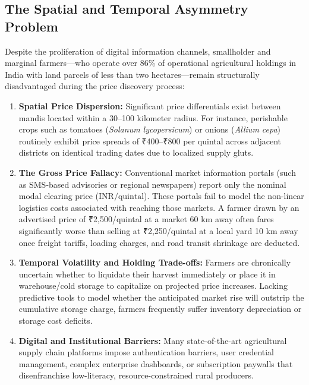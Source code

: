 \documentclass[conference]{IEEEtran}
\begin{document}
\subsection{The Spatial and Temporal Asymmetry Problem}
Despite the proliferation of digital information channels, smallholder and marginal farmers---who operate over 86\% of operational agricultural holdings in India with land parcels of less than two hectares---remain structurally disadvantaged during the price discovery process:
\begin{enumerate}
    \item \textbf{Spatial Price Dispersion:} Significant price differentials exist between mandis located within a 30--100 kilometer radius. For instance, perishable crops such as tomatoes (\textit{Solanum lycopersicum}) or onions (\textit{Allium cepa}) routinely exhibit price spreads of ₹400--₹800 per quintal across adjacent districts on identical trading dates due to localized supply gluts.
    \item \textbf{The Gross Price Fallacy:} Conventional market information portals (such as SMS-based advisories or regional newspapers) report only the nominal modal clearing price ($\text{INR}/\text{quintal}$). These portals fail to model the non-linear logistics costs associated with reaching those markets. A farmer drawn by an advertised price of ₹2,500/quintal at a market 60 km away often fares significantly worse than selling at ₹2,250/quintal at a local yard 10 km away once freight tariffs, loading charges, and road transit shrinkage are deducted.
    \item \textbf{Temporal Volatility and Holding Trade-offs:} Farmers are chronically uncertain whether to liquidate their harvest immediately or place it in warehouse/cold storage to capitalize on projected price increases. Lacking predictive tools to model whether the anticipated market rise will outstrip the cumulative storage charge, farmers frequently suffer inventory depreciation or storage cost deficits.
    \item \textbf{Digital and Institutional Barriers:} Many state-of-the-art agricultural supply chain platforms impose authentication barriers, user credential management, complex enterprise dashboards, or subscription paywalls that disenfranchise low-literacy, resource-constrained rural producers.
\end{enumerate}
\end{document}

